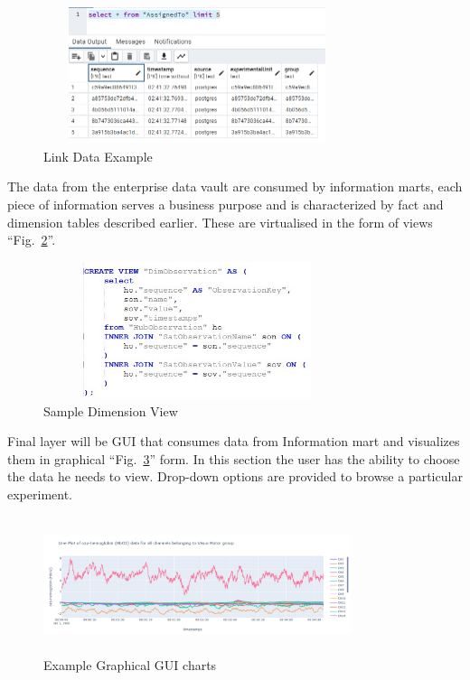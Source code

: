\documentclass[conference]{IEEEtran}
\begin{document}
\begin{figure}[htbp]
\centerline{\includegraphics[width=9cm, height=4cm]{Figure9.png}}
\caption{Link Data Example}
\label{fig9}
\end{figure}

The data from the enterprise data vault are consumed by information marts, each piece of information serves a business purpose and is characterized by fact and dimension tables described earlier. These are virtualised in the form of views ``Fig.~\ref{fig10}''.

\begin{figure}[htbp]
\centerline{\includegraphics[width=9cm, height=4cm]{Figure10.png}}
\caption{Sample Dimension View}
\label{fig10}
\end{figure}

Final layer will be GUI that consumes data from Information mart and visualizes them in graphical ``Fig.~\ref{fig11}'' form. In this section the user has the ability to choose the data he needs to view. Drop-down options are provided to browse a particular experiment.


\begin{figure}[htbp]
\centerline{\includegraphics[width=9cm, height=4cm]{Figure11.png}}
\caption{Example Graphical GUI charts}
\label{fig11}
\end{figure}
\end{document}
